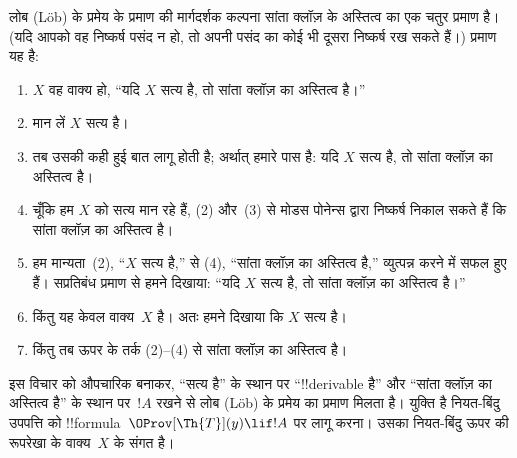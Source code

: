 \documentclass[../../../include/open-logic-section]{subfiles}
\begin{document}
\begin{explain}
लोब (L\"ob) के प्रमेय के प्रमाण की मार्गदर्शक कल्पना सांता क्लॉज़ के
अस्तित्व का एक चतुर प्रमाण है। (यदि आपको वह निष्कर्ष पसंद न हो, तो अपनी
पसंद का कोई भी दूसरा निष्कर्ष रख सकते हैं।) प्रमाण यह है:
\begin{enumerate}
\item $X$ वह वाक्य हो, ``यदि $X$ सत्य है, तो सांता क्लॉज़ का अस्तित्व है।''
\item मान लें $X$ सत्य है।
\item तब उसकी कही हुई बात लागू होती है; अर्थात् हमारे पास है: यदि $X$ सत्य
  है, तो सांता क्लॉज़ का अस्तित्व है।
\item चूँकि हम $X$ को सत्य मान रहे हैं, (2) और~(3) से मोडस पोनेन्स द्वारा
  निष्कर्ष निकाल सकते हैं कि सांता क्लॉज़ का अस्तित्व है।
\item हम मान्यता~(2), ``$X$ सत्य है,'' से (4), ``सांता क्लॉज़ का अस्तित्व
  है,'' व्युत्पन्न करने में सफल हुए हैं। सप्रतिबंध प्रमाण से हमने दिखाया:
  ``यदि $X$ सत्य है, तो सांता क्लॉज़ का अस्तित्व है।''
\item किंतु यह केवल वाक्य~$X$ है। अतः हमने दिखाया कि $X$ सत्य है।
\item किंतु तब ऊपर के तर्क (2)--(4) से सांता क्लॉज़ का अस्तित्व है।
\end{enumerate}
इस विचार को औपचारिक बनाकर, ``सत्य है'' के स्थान पर ``!!{derivable} है'' और
``सांता क्लॉज़ का अस्तित्व है'' के स्थान पर~$!A$ रखने से लोब (L\"ob) के
प्रमेय का प्रमाण मिलता है। युक्ति है नियत-बिंदु उपपत्ति को
!!{formula}~$\OProv[\Th{T}](y) \lif !A$ पर लागू करना। उसका नियत-बिंदु ऊपर
की रूपरेखा के वाक्य~$X$ के संगत है।
\end{explain}
\end{document}
